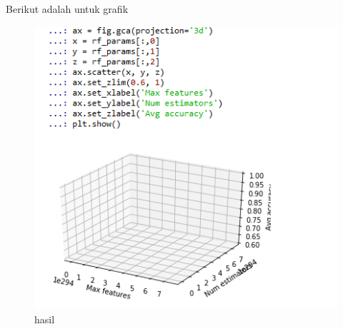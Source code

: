 \begin{enumerate}
\par Berikut adalah untuk grafik

\begin{figure}[H]
\centering
\includegraphics[scale=0.7]{figures/1174012/chapter4/14.PNG}
\caption{hasil}
\label{Praktek no 8 Grafik}
\end{figure}
\end{enumerate}







